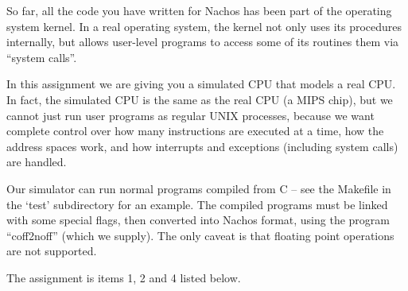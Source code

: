 So far, all the code you have written for Nachos has been part of the
operating system kernel. In a real operating system, the kernel not only
uses its procedures internally, but allows user-level programs to access
some of its routines them via ``system calls''.

In this assignment we are giving you a simulated CPU that models a real CPU.
In fact, the simulated
CPU is the same as the real CPU (a MIPS chip), but we cannot just run
user programs as regular UNIX processes, because we want complete
control over how many instructions are executed at a time, how the
address spaces work, and how interrupts and exceptions (including
system calls) are handled.

Our simulator can run normal programs compiled from C -- see
the Makefile in the `test' subdirectory for an example.  The compiled
programs must be linked with some special flags, then converted into
Nachos format, using the program ``coff2noff'' (which we supply).
The only caveat is that floating point operations are not supported.

The assignment is items 1, 2 and 4 listed below.

